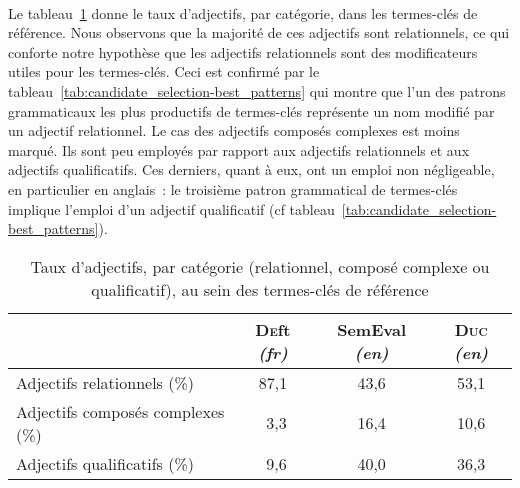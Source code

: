       ~\\Le tableau~\ref{tab:candidate_selection-adjective_categories} donne le
      taux d'adjectifs, par catégorie, dans les termes-clés de référence. Nous
      observons que la majorité de ces adjectifs sont relationnels, ce qui
      conforte notre hypothèse que les adjectifs relationnels sont des
      modificateurs utiles pour les termes-clés. Ceci est confirmé par le
      tableau~\ref{tab:candidate_selection-best_patterns} qui montre que l'un
      des patrons grammaticaux les plus productifs de termes-clés représente un
      nom modifié par un adjectif relationnel. Le cas des adjectifs composés
      complexes est moins marqué. Ils sont peu employés par rapport aux
      adjectifs relationnels et aux adjectifs qualificatifs. Ces derniers, quant
      à eux, ont un emploi non négligeable, en particulier en anglais~: le
      troisième patron grammatical de termes-clés implique l'emploi d'un
      adjectif qualificatif
      (cf tableau~\ref{tab:candidate_selection-best_patterns}).
      \begin{table}[!ht]
        \centering
          \begin{tabular}{l|ccc}
            \toprule
             & \textbf{\textsc{De}ft} \textit{(fr)} & \textbf{SemEval} \textit{(en)} & \textbf{\textsc{Duc}} \textit{(en)}\\
            \hline
            Adjectifs relationnels \hfill(\%) & 87,1 & 43,6 & 53,1\\
            Adjectifs composés complexes \hfill(\%) & $~~$3,3 & 16,4 & 10,6\\
            Adjectifs qualificatifs \hfill(\%) & $~~$9,6 & 40,0 & 36,3\\
            \bottomrule
        \end{tabular}
        \caption{Taux d'adjectifs, par catégorie (relationnel, composé complexe
                 ou qualificatif), au sein des termes-clés de référence}
                 \label{tab:candidate_selection-adjective_categories}
      \end{table}

